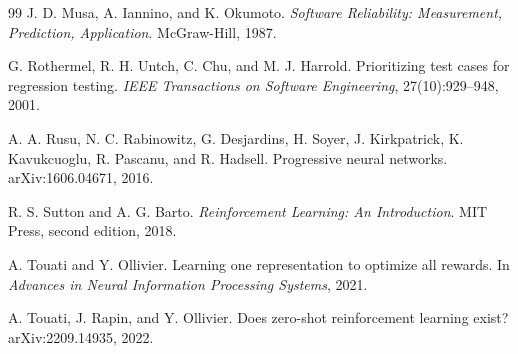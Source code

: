 \documentclass[11pt,a4paper]{article}
\begin{document}
\begin{thebibliography}{99}
J. D. Musa, A. Iannino, and K. Okumoto.
\newblock \emph{Software Reliability: Measurement, Prediction, Application}.
\newblock McGraw-Hill, 1987.

G. Rothermel, R. H. Untch, C. Chu, and M. J. Harrold.
\newblock Prioritizing test cases for regression testing.
\newblock \emph{IEEE Transactions on Software Engineering}, 27(10):929--948, 2001.

A. A. Rusu, N. C. Rabinowitz, G. Desjardins, H. Soyer, J. Kirkpatrick, K. Kavukcuoglu, R. Pascanu, and R. Hadsell.
\newblock Progressive neural networks.
\newblock arXiv:1606.04671, 2016.

R. S. Sutton and A. G. Barto.
\newblock \emph{Reinforcement Learning: An Introduction}.
\newblock MIT Press, second edition, 2018.

A. Touati and Y. Ollivier.
\newblock Learning one representation to optimize all rewards.
\newblock In \emph{Advances in Neural Information Processing Systems}, 2021.

A. Touati, J. Rapin, and Y. Ollivier.
\newblock Does zero-shot reinforcement learning exist?
\newblock arXiv:2209.14935, 2022.

\end{thebibliography}
\end{document}

